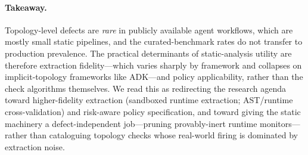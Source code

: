 \paragraph{Takeaway.}
Topology-level defects are \emph{rare} in publicly available agent workflows,
which are mostly small static pipelines, and the curated-benchmark rates do not
transfer to production prevalence. The practical determinants of static-analysis
utility are therefore extraction fidelity---which varies sharply by framework and
collapses on implicit-topology frameworks like ADK---and policy applicability,
rather than the check algorithms themselves. We read this as redirecting the
research agenda toward higher-fidelity extraction (sandboxed runtime extraction;
AST/runtime cross-validation) and risk-aware policy specification, and toward
giving the static machinery a defect-independent job---pruning provably-inert
runtime monitors---rather than cataloguing topology checks whose real-world
firing is dominated by extraction noise.
